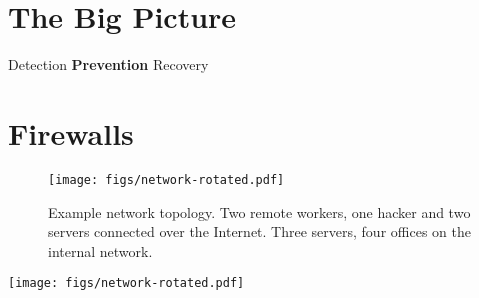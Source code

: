 \mode*




\section{The Big Picture}

\begin{frame}
  \begin{center}
    Detection
    \qquad
    \textbf{Prevention}
    \qquad
    Recovery
  \end{center}
\end{frame}


\section{Firewalls}

\begin{frame}
  \begin{figure}
    \texttt{[image: figs/network-rotated.pdf]}
    \caption{Example network topology.
      Two remote workers, one hacker and two servers connected over the 
      Internet.
      Three servers, four offices on the internal network.
    }
  \end{figure}
\end{frame}

\begin{frame}
  \centering
  \texttt{[image: figs/network-rotated.pdf]}

\end{frame}

